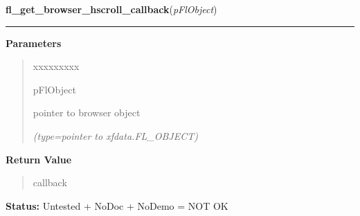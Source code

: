 \hspace{.8\funcindent}\begin{boxedminipage}{\funcwidth}

    \raggedright \textbf{fl\_get\_browser\_hscroll\_callback}(\textit{pFlObject})

    \vspace{-1.5ex}

    \rule{\textwidth}{0.5\fboxrule}
\setlength{\parskip}{2ex}
\setlength{\parskip}{1ex}
      \textbf{Parameters}
      \vspace{-1ex}

      \begin{quote}
        \begin{Ventry}{xxxxxxxxx}

          \item[pFlObject]

          pointer to browser object

            {\it (type=pointer to xfdata.FL\_OBJECT)}

        \end{Ventry}

      \end{quote}

      \textbf{Return Value}
    \vspace{-1ex}

      \begin{quote}
      callback

      \end{quote}

\textbf{Status:} Untested + NoDoc + NoDemo = NOT OK



    \end{boxedminipage}

    \label{xformslib:flbrowser:fl_get_browser_vscroll_callback}

    \vspace{0.5ex}


